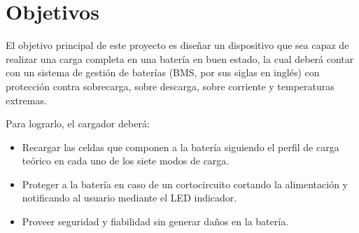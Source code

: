 \section{Objetivos}

El objetivo principal de este proyecto es diseñar un dispositivo que sea capaz de realizar una carga completa en una batería en buen estado,
la cual deberá contar con un sistema de gestión de baterías (BMS, por sus siglas en inglés)
con protección contra sobrecarga, sobre descarga, sobre corriente y temperaturas extremas.

Para lograrlo, el cargador deberá:
\begin{itemize}
    \item Recargar las celdas que componen a la batería siguiendo el perfil de carga teórico en cada uno de los siete modos de carga.
    \item Proteger a la batería en caso de un cortocircuito cortando la alimentación y notificando al usuario mediante el LED indicador.
    \item Proveer seguridad y fiabilidad sin generar daños en la batería.
\end{itemize}